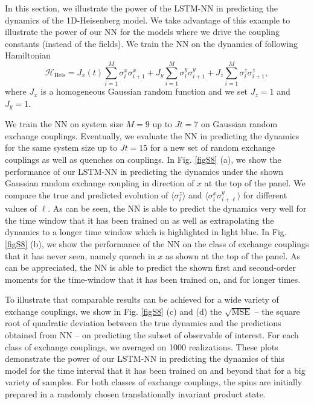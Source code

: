 \documentclass[a4paper,aps,amsmath,amssymb,twocolumn,longbibliography,,accepted=2022-05-17]{quantumarticle}
\begin{document}
In this section, we illustrate the power of the LSTM-NN in predicting the dynamics of the 1D-Heisenberg model. We take advantage of this example to illustrate the power of our NN for the models where we drive the coupling constants (instead of the fields). 
We train the NN on the dynamics of following  Hamiltonian
\begin{equation}
	\mathcal{H}_{\mathrm{Heis}}=J_{x} (t)\sum_{i=1}^M \sigma_{i}^{x} \sigma_{i+1}^{x}+J_{y}  \sum_{i=1}^M\sigma_{i}^{y} \sigma_{i+1}^{y}+J_{z} \sum_{i=1}^M \sigma_{i}^{z} \sigma_{i+1}^{z},
\end{equation}
where $J_x$ is a homogeneous Gaussian random function and we set $J_z=1$ and $J_y=1$.


We train the NN on system size $M=9$ up to $Jt=7$ on  Gaussian random exchange couplings. Eventually, we evaluate the NN in predicting the dynamics for the same system size up to $Jt=15$ for a new set of random exchange couplings as well as quenches on couplings. In Fig. \ref{figS8} (a), we show the performance of our LSTM-NN in predicting the dynamics under the  shown  Gaussian random exchange coupling in direction of $ x $ at the top of the panel. We compare the true and predicted evolution of $\langle \sigma^z_i \rangle$ and $\langle \sigma^{x}_{i}\sigma^{y}_{i+\ell} \rangle$ for different values of $\ell$. As can be seen, the NN is able to predict the dynamics very well for the time window that it has been trained on as well as extrapolating the dynamics to a longer time window which is highlighted in light blue. In Fig. \ref{figS8} (b), we show the performance of the NN on the class of exchange couplings that it has never seen, namely quench in $x$  as shown at the top of the panel.  As can be appreciated, the NN is able to predict the shown first and second-order moments for the time-window that it has been trained on, and  for longer times. %


To illustrate that comparable results can be achieved for a wide variety of exchange couplings, we show in Fig.  \ref{figS8}  (c) and (d) the $\sqrt{\textrm{MSE}}$ -- the square root of quadratic deviation between the true dynamics and the predictions obtained from NN -- on predicting the subset of observable of interest. For each class of exchange couplings, we averaged on 1000 realizations. These plots demonstrate the power of our LSTM-NN in predicting the dynamics of this model for the time interval that it has been trained on and beyond that for a big variety of samples. For both classes of exchange couplings, the spins are initially prepared in a randomly chosen translationally invariant product state.
\end{document}
